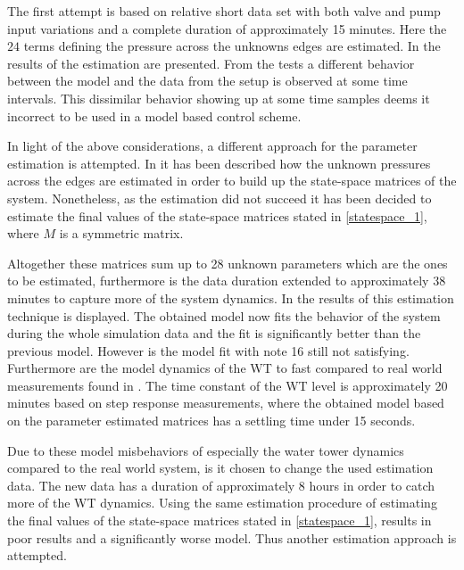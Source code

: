 The first attempt is based on relative short data set with both valve and pump input variations and a complete duration of approximately 15 minutes. Here the $24$ terms defining the pressure across the unknowns edges are estimated. In  the results of the estimation are presented.
From the tests a different behavior between the model and the data from the setup is observed at some time intervals. This dissimilar behavior showing up at some time samples deems it incorrect to be used in a model based control scheme. 

In light of the above considerations, a different approach for the parameter estimation is attempted. In  it has been described how the unknown pressures across the edges are estimated in order to build up the state-space matrices of the system. Nonetheless, as the estimation did not succeed it has been decided to estimate the final values of the state-space matrices stated in \eqref{statespace_1}, where $M$ is a symmetric matrix.

Altogether these matrices sum up to 28 unknown parameters which are the ones to be estimated, furthermore is the data duration extended to approximately 38 minutes to capture more of the system dynamics. In  the results of this estimation technique is displayed. 
The obtained model now fits the behavior of the system during the whole simulation data and the fit is significantly better than the previous model. However is the model fit with note 16 still not satisfying. 
Furthermore are the model dynamics of the WT to fast compared to real world measurements found in . The time constant of the WT level is approximately 20 minutes based on step response measurements, where the obtained model based on the parameter estimated matrices has a settling time under 15 seconds.

Due to these model misbehaviors of especially the water tower dynamics compared to the real world system, is it chosen to change the used estimation data. The new data has a duration of approximately 8 hours in order to catch more of the WT dynamics. Using the same estimation procedure of estimating the final values of the state-space matrices stated in \eqref{statespace_1}, results in poor results and a significantly worse model. Thus another estimation approach is attempted. 

